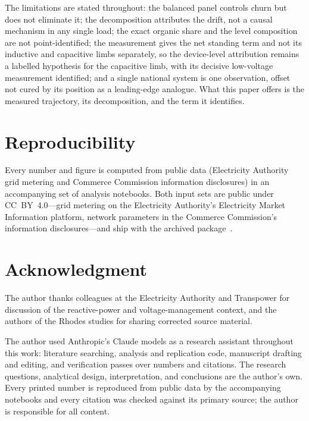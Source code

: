 \documentclass[journal]{IEEEtran}
\begin{document}
The limitations are stated throughout: the balanced panel controls churn but does
not eliminate it; the decomposition attributes the drift, not a causal mechanism
in any single load; the exact organic share and the level composition are not
point-identified; the measurement gives the net standing term and not its
inductive and capacitive limbs separately, so the device-level attribution remains
a labelled hypothesis for the capacitive limb, with its decisive low-voltage
measurement identified; and a single national system is one observation, offset
not cured by its position as a leading-edge analogue. What this paper offers is
the measured trajectory, its decomposition, and the term it identifies.

\section*{Reproducibility}
Every number and figure is computed from public data (Electricity Authority grid
metering and Commerce Commission information disclosures) in an accompanying set
of analysis notebooks. Both input sets are public under CC~BY~4.0---grid metering
on the Electricity Authority's Electricity Market Information platform, network
parameters in the Commerce Commission's information disclosures---and ship with the
archived package~\cite{hume_archive}.

\section*{Acknowledgment}
The author thanks colleagues at the Electricity Authority and Transpower for
discussion of the reactive-power and voltage-management context, and the authors of the
Rhodes studies for sharing corrected source material.

The author used Anthropic's Claude models as a research assistant throughout this
work: literature searching, analysis and replication code, manuscript drafting and
editing, and verification passes over numbers and citations. The research questions,
analytical design, interpretation, and conclusions are the author's own. Every
printed number is reproduced from public data by the accompanying notebooks and
every citation was checked against its primary source; the author is responsible for
all content.



\end{document}
